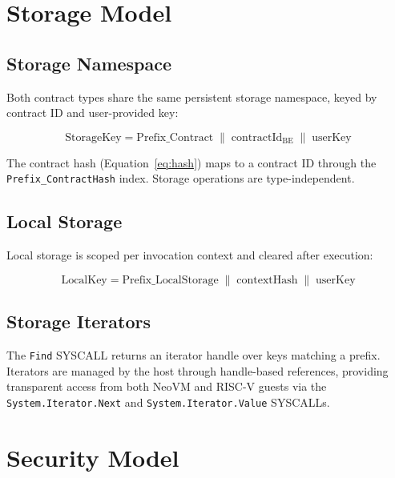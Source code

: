 \documentclass[11pt,a4paper]{article}
\begin{document}
\section{Storage Model}
\label{sec:storage}

\subsection{Storage Namespace}

Both contract types share the same persistent storage namespace, keyed by
contract ID and user-provided key:

\begin{equation}
\text{StorageKey} = \text{Prefix\_Contract} \;\|\; \text{contractId}_{\text{BE}} \;\|\; \text{userKey}
\label{eq:storage-key}
\end{equation}

The contract hash (Equation~\ref{eq:hash}) maps to a contract ID through the
\texttt{Prefix\_ContractHash} index. Storage operations are type-independent.

\subsection{Local Storage}

Local storage is scoped per invocation context and cleared after execution:

\begin{equation}
\text{LocalKey} = \text{Prefix\_LocalStorage} \;\|\; \text{contextHash} \;\|\; \text{userKey}
\label{eq:local-key}
\end{equation}

\subsection{Storage Iterators}

The \texttt{Find} SYSCALL returns an iterator handle over keys matching a
prefix. Iterators are managed by the host through handle-based references,
providing transparent access from both NeoVM and RISC-V guests via the
\texttt{System.Iterator.Next} and \texttt{System.Iterator.Value} SYSCALLs.

\section{Security Model}
\label{sec:security}
\end{document}
